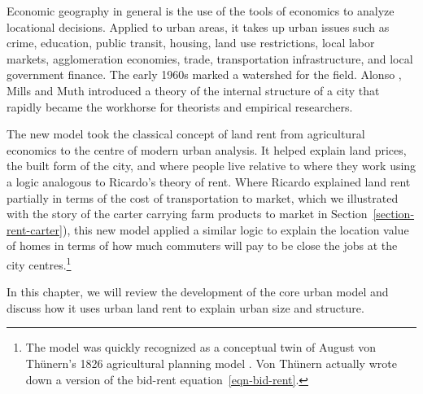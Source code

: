 
Economic geography in general is the use of the tools of economics to analyze locational decisions. Applied to urban areas, it takes up urban issues such as crime, education, public transit, housing, land use restrictions, local labor markets, agglomeration economies, trade, transportation infrastructure, and local government finance. %
The early 1960s marked a watershed for the field.  Alonso \cite{alonsoModelUrbanLand1960, alonsoTheoryUrbanLand1960}, Mills \cite{millsAggregativeModelResource1967} and Muth \cite{muthCitiesHousingSpatial1969} introduced a theory of the internal structure of a city that rapidly became the workhorse for theorists and empirical researchers. 

The new model took the classical concept of land rent from agricultural economics to the centre of modern urban analysis. It helped explain land prices, the built form of the city, and where people live relative to where they work using a logic analogous to Ricardo's theory of rent. Where Ricardo explained land rent partially in terms of the cost of transportation to market, which we illustrated with the story of the carter carrying farm products to market in Section~\ref{section-rent-carter}), this new model applied a similar logic to explain the location value of homes in terms of how much commuters will pay to be close the jobs at the city centres.\footnote{The model was quickly recognized as a conceptual twin of August von Th\"unern's 1826 agricultural planning model \cite{vonthunenIsolirteStaatBeziehung1826}. Von Th\"unern actually wrote down a version of the bid-rent equation~\ref{eqn-bid-rent}.}

In this chapter, we will review the development of the core urban model and discuss how it uses urban land rent to explain urban size and structure. %


